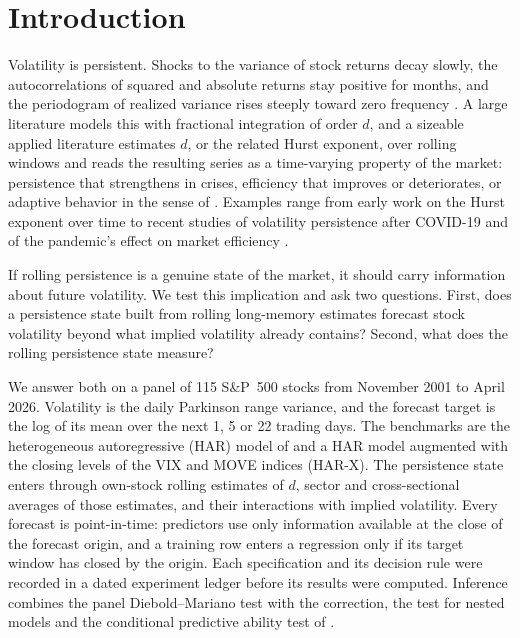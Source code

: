 \section{Introduction}\label{sec:intro}

Volatility is persistent. Shocks to the variance of stock returns decay
slowly, the autocorrelations of squared and absolute returns stay positive
for months, and the periodogram of realized variance rises steeply toward
zero frequency \citep{ding1993long, andersen2003modeling}. A large
literature models this with fractional integration of order $d$, and a
sizeable applied literature estimates $d$, or the related Hurst exponent,
over rolling windows and reads the resulting series as a time-varying
property of the market: persistence that strengthens in crises, efficiency
that improves or deteriorates, or adaptive behavior in the sense of
\citet{lo2004adaptive}. Examples range from early work on the Hurst exponent
over time \citep{cajueiro2004hurst} to recent studies of volatility
persistence after COVID-19 \citep{veravaldes2022persistence} and of the
pandemic's effect on market efficiency \citep{takaishi2025}.

If rolling persistence is a genuine state of the market, it should carry
information about future volatility. We test this implication and ask two
questions. First, does a persistence state built from rolling long-memory
estimates forecast stock volatility beyond what implied volatility already
contains? Second, what does the rolling persistence state measure?

We answer both on a panel of 115 S\&P~500 stocks from November 2001 to April
2026. Volatility is the daily Parkinson range variance, and the forecast
target is the log of its mean over the next 1, 5 or 22 trading days. The
benchmarks are the heterogeneous autoregressive (HAR) model of
\citet{corsi2009simple} and a HAR model augmented with the closing levels of
the VIX and MOVE indices (HAR-X). The persistence state enters through
own-stock rolling estimates of $d$, sector and cross-sectional averages of
those estimates, and their interactions with implied volatility. Every
forecast is point-in-time: predictors use only information available at the
close of the forecast origin, and a training row enters a regression only if
its target window has closed by the origin. Each specification and its
decision rule were recorded in a dated experiment ledger before its results
were computed. Inference combines the panel Diebold--Mariano test with the
\citet{harvey1997testing} correction, the \citet{clark2007approximately} test
for nested models and the conditional predictive ability test of
\citet{giacomini2006tests}.

